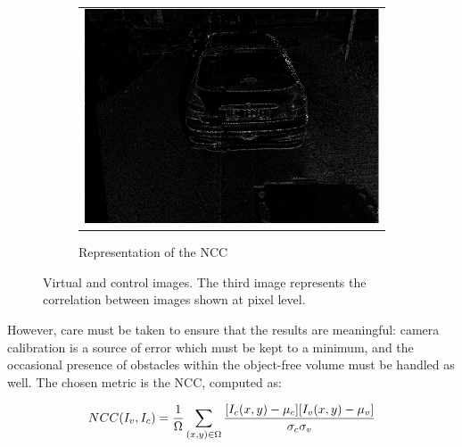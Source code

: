 \begin{figure}[h!]
        ~
        \begin{subfigure}[b]{0.3\textwidth}
	  \begin{tabular}{c}
	    \includegraphics[width=\textwidth]{ncc}
	  \end{tabular}
	  \caption{Representation of the \ac{NCC}}\label{fig:cp03_ncc_comparison}
        \end{subfigure}%
        
        \caption{Virtual and control images. The third image represents the correlation between images shown at pixel level.}\label{fig:cp03_ncc}
\end{figure}

However, care must be taken to ensure that the results are meaningful: camera calibration is a source of error which must be kept to a minimum, and the occasional presence of obstacles within the object-free volume must be handled as well. The chosen metric is the \ac{NCC}, computed as:

\begin{equation}\label{eq:cp03_NCC}
NCC(I_v,I_c) = {{{1} \over {\Omega}}  \sum_{(x,y) \in \Omega} {{[I_c(x,y)-\mu_c][I_v(x,y)-\mu_v]} \over {\sigma_c \sigma_v}}}
\end{equation}

